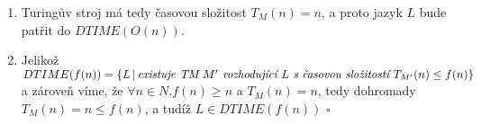 \documentclass[a4paper]{article}
\begin{document}
\begin{enumerate}
    \item Turingův stroj má tedy časovou složitost $T_M(n)=n$, a proto jazyk $L$ bude patřit do $DTIME(O(n))$.
    \item Jelikož $DTIME(f(n)) = \{L\,|\, \emph{existuje TM }M' \emph{ rozhodující }L\emph{ s~časovou složitostí } T_{M'}(n) \leq f(n)\}$ a zároveň
    víme, že $\forall n \in N.f(n) \geq n$ a $T_M(n)=n$, tedy dohromady $T_M(n)=n \leq f(n)$, a tudíž $L\in DTIME(f(n))$ $\square$
\end{enumerate}
\end{document}
